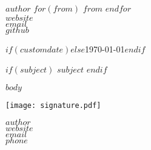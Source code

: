 \documentclass[$fontsize$, letterpaper]{article}
\begin{document}
\small
\textsc{\textbf{$author$}}
$for(from)$
\textbullet{} \textsc{$from$}
$endfor$\\
$website$\\
$email$\\
$github$

\vspace{1em}

\normalsize \sffamily

\vspace{3em}

\rmfamily
\begin{flushright}
  $if(customdate)$$else$\today$endif$
\end{flushright}

\vspace{1em}

$if(subject)$
\textbf{$subject$}
$endif$

\vspace{1em}

$body$

\begin{FlushLeft}
  {
    \texttt{[image: signature.pdf]} \par
  }
  {
  }
  $author$\\\small
  $website$\\\small
  $email$\\\small
  $phone$\\\small
\end{FlushLeft}
\end{document}
